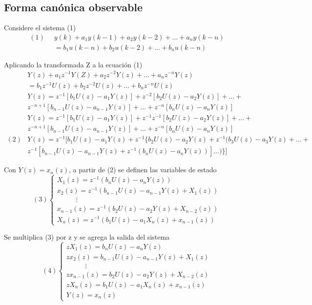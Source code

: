 \subsection{Forma canónica observable}

Considere el sistema (1)
\[
    \begin{split}
        (1) \;\; & y(k) + a_{1}y(k-1) + a_{2}y(k-2) + \ldots + a_{n}y(k-n) \\
            & = b_{1}u(k-n) + b_{2}u(k-2) + \ldots + b_{n}u(k-n)
    \end{split}
\]

Aplicando la transformada Z a la ecuación (1)
\[
    \begin{split}
        & Y(z) + a_{1}z^{-1}Y(Z) + a_{2}z^{-2}Y(z) + \ldots + a_{n}z^{-n}Y(z) \\
        & = b_{1}z^{-1}U(z) + b_{2}z^{-2}U(z) + \ldots + b_{n}z^{-n}U(z) \\
        & Y(z) = z^{-1}[b_{1}U(z) - a_{1}Y(z)] + z^{-2}[ b_{2}U(z) - a_{2}Y(z) ] + \ldots + \\
        & z^{-n+1}[ b_{n-1}U(z) - a_{n-1}Y(z) ] + \ldots + z^{-n}[ b_{n}U(z) - a_{n}Y(z) ] \\
        & Y(z) = z^{-1}[ b_{1}U(z) - a_{1}Y(z) ] + z^{-1}z^{-1}[b_{2}U(z)-a_{2}Y(z)] + \ldots + \\
        & z^{-n+1}[b_{n-1}U(z)-a_{n-1}Y(z)] + \ldots + z^{-n}[b_{n}U(z)-a_{n}Y(z)] \\
        (2) & Y(z) = z^{-1} [ b_{1}U(z) - a_{1}Y(z) + z^{-1}\{ b_{2}U(z) - a_{2}Y(z) + z^{-1}(b_{3}U(z) - a_{3}Y(z) + \ldots + \\
        & z^{-1}[b_{n-1}U(z) - a_{n-1}Y(z) + z^{-1}( b_{n}U(z)-a_{n}Y(z) )]\ldots) \}]
    \end{split}
\]

Con \( Y(z) = x_{n}(z) \), a partir de (2) se definen las variables de estado
\[(3)
    \left\{
        \begin{array}{lll}
            X_{1}(z) = z^{-1}(b_{n}U(z) - a_{n}Y(z)) \\ 
            x_{2}(z) = z^{-1}(b_{n-1}U(z) - a_{n-1}Y(z) + X_{1}(z)) \\
            \;\;\;\;\;\;\;\;\;\; \vdots \\
            x_{n-1}(z) = z^{-1}(b_{2}U(z) - a_{2}Y(z) + X_{n-2}(z)) \\
            X_{n}(z) = z^{-1}(b_{1}U(z) - a_{1}X_{n}(z) + x_{n-1}(z))
        \end{array}
    \right.
\]

Se multiplica (3) por z y se agrega la salida del sistema
\[(4)
    \left\{
        \begin{array}{lll}
            zX_{1}(z) = b_{n}U(z)-a_{n}Y(z) \\ 
            zx_{2}(z) = b_{n-1}U(z)-a_{n-1}Y(z)+X_{1}(z) \\
            \;\;\;\;\;\;\;\;\;\; \vdots \\
            zx_{n-1}(z) = b_{2}U(z)-a_{2}Y(z) + X_{n-2}(z) \\
            zX_{n}(z) = b_{1}U(z)-a_{1}X_{n}(z)+x_{n-1}(z) \\
            Y(z) = x_{n}(z)
        \end{array}
    \right.
\]

